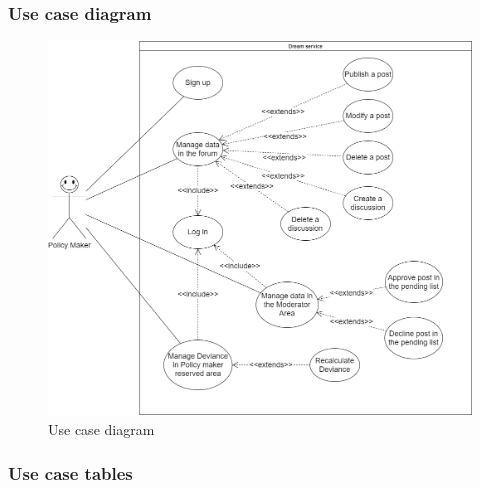 \subsubsection*{Use case diagram}
\begin{figure}[h!]
        \centering
        \includegraphics[scale=0.35]{images/use_cases_diagram/policymaker_use_case.png}
        \caption{Use case diagram}
        \label{fig:policy_maker_use_case}
    \end{figure}
 \newpage
\subsubsection*{Use case tables}

